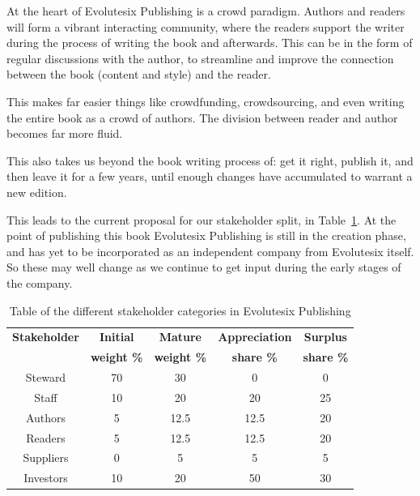 At the heart of Evolutesix Publishing is a crowd paradigm. Authors and readers will form a vibrant interacting community, where the readers support the writer during the process of writing the book and afterwards. This can be in the form of regular discussions with the author, to streamline and improve the connection between the book (content and style) and the reader.


This makes far easier things like crowdfunding, crowdsourcing, and even writing the entire book as a crowd of authors. The division between reader and author becomes far more fluid.


This also takes us beyond the book writing process of: get it right, publish it, and then leave it for a few years, until enough changes have accumulated to warrant a new edition.


This leads to the current proposal for our stakeholder split, in Table~\ref{table:publishing-stakeholders}. At the point of publishing this book Evolutesix Publishing is still in the creation phase, and has yet to be incorporated as an independent company from Evolutesix itself. So these may well change as we continue to get input during the early stages of the company.


\begin{table}[htbp]
\centering  
\begin{tabular}{ c  c  c  c  c  }
\toprule
\textbf{Stakeholder} & \textbf{Initial } & \textbf{Mature }& \textbf{Appreciation }& \textbf{Surplus} \\
\textbf{} & \textbf{weight \%} & \textbf{weight \%}& \textbf{share \%}& \textbf{share \%} \\
        \midrule
 Steward  & 70 & 30     & 0       & 0 \\
 Staff        & 10  & 20    & 20     & 25 \\
 Authors   & 5   & 12.5  & 12.5  & 20 \\
 Readers  & 5   & 12.5  & 12.5  & 20 \\
 Suppliers & 0   & 5       & 5       & 5 \\
 Investors & 10 & 20     & 50     & 30 \\
\bottomrule
\end{tabular}
\caption[Stakeholder categories in Evolutesix Publishing]{Table of the different stakeholder categories in Evolutesix Publishing}
\label{table:publishing-stakeholders}
\end{table}






